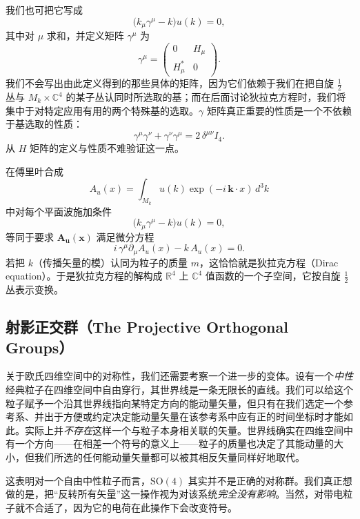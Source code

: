 我们也可把它写成
\[
\big(k_\mu\gamma^\mu-k\big)u(k)=0,
\]
其中对 $\mu$ 求和，并定义矩阵 $\gamma^\mu$ 为
\[
\gamma^\mu=\begin{pmatrix}0 & H_\mu\\ H_\mu^* & 0\end{pmatrix}.
\]
我们不会写出由此定义得到的那些具体的矩阵，因为它们依赖于我们在把自旋 $\tfrac12$ 丛与 $M_k\times\mathbb{C}^4$ 的某子丛认同时所选取的基；而在后面讨论狄拉克方程时，我们将集中于对特定应用有用的两个特殊基的选取。$\gamma$ 矩阵真正重要的性质是一个不依赖于基选取的性质：
\[
\gamma^\mu\gamma^\nu+\gamma^\nu\gamma^\mu=2\,\delta^{\mu\nu}I_4 .
\]
从 $H$ 矩阵的定义与性质不难验证这一点。

在傅里叶合成
\[
A_u(x)=\int_{M_k}u(k)\exp(-i\,\mathbf{k}\cdot x)\,d^3k
\]
中对每个平面波施加条件
\[
\big(k_\mu\gamma^\mu-k\big)u(k)=0,
\]
等同于要求 $\mathbf{A}_{\mathbf{u}}(\mathbf{x})$ 满足微分方程
\[
i\,\gamma^\mu\partial_\mu A_u(x)-k\,A_u(x)=0 .
\]
若把 $k$（传播矢量的模）认同为粒子的质量 $m$，这恰恰就是狄拉克方程（Dirac equation）。于是狄拉克方程的解构成 $\mathbb{R}^4$ 上 $\mathbb{C}^4$ 值函数的一个子空间，它按自旋 $\tfrac12$ 丛表示变换。

\subsection{射影正交群（The Projective Orthogonal Groups）}

关于欧氏四维空间中的对称性，我们还需要考察一个进一步的变体。设有一个\emph{中性}经典粒子在四维空间中自由穿行，其世界线是一条无限长的直线。我们可以给这个粒子赋予一个沿其世界线指向某特定方向的能动量矢量，但只有在我们选定一个参考系、并出于方便或约定决定能动量矢量在该参考系中应有正的时间坐标时才能如此。实际上并\emph{不存在}这样一个与粒子本身相关联的矢量。世界线确实在四维空间中有一个方向——在相差一个符号的意义上——粒子的质量也决定了其能动量的大小，但我们所选的任何能动量矢量都可以被其相反矢量同样好地取代。

这表明对一个自由中性粒子而言，$\mathrm{SO}(4)$ 其实并不是正确的对称群。我们真正想做的是，把“反转所有矢量”这一操作视为对该系统\emph{完全没有影响}。当然，对带电粒子就不合适了，因为它的电荷在此操作下会改变符号。

